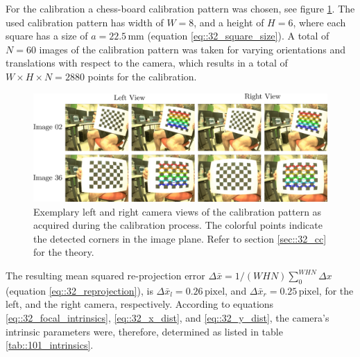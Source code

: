 For the calibration a chess-board calibration pattern was chosen, see figure \ref{fig::101_calib}. The used calibration pattern has width of $W=8$, and a height of $H=6$, where each square has a size of $a=22.5\,\text{mm}$ (equation \ref{eq::32_square_size}). A total of $N=60$ images of the calibration pattern was taken for varying orientations and translations with respect to the camera, which results in a total of $W\times H\times N = 2880$ points for the calibration. 
\begin{figure}[h!]
	\centering
	\includegraphics[scale=.28]{chapters/10_image_processing_experiments/img/calib.png}
	\caption{Exemplary left and right camera views of the calibration pattern as acquired during the calibration process. The colorful points indicate the detected corners in the image plane. Refer to section \ref{sec::32_cc} for the theory.}
	\label{fig::101_calib}
\end{figure}
The resulting mean squared re-projection error $\Delta \bar{x} = 1/(WHN)\sum_0^{WHN} \Delta x$ (equation \ref{eq::32_reprojection}), is $\Delta \bar{x}_l = 0.26\, \text{pixel}$, and $\Delta \bar{x}_r = 0.25\,\text{pixel}$, for the left, and the right camera, respectively. According to equations \ref{eq::32_focal_intrinsics}, \ref{eq::32_x_dist}, and \ref{eq::32_y_dist}, the camera's intrinsic parameters were, therefore, determined as listed in table \ref{tab::101_intrinsics}.
